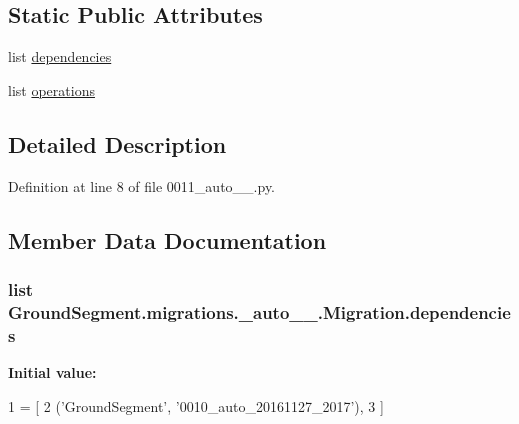 \subsection*{Static Public Attributes}
\begin{DoxyCompactItemize}
\item 
list \hyperlink{class_ground_segment_1_1migrations_1_10011__auto__20161127__2019_1_1_migration_ac56b2578fa158a6fb8bf8867093276b7}{dependencies}
\item 
list \hyperlink{class_ground_segment_1_1migrations_1_10011__auto__20161127__2019_1_1_migration_aa243936ecd74c7dd0820388603605312}{operations}
\end{DoxyCompactItemize}


\subsection{Detailed Description}


Definition at line 8 of file 0011\+\_\+auto\+\_\+\_.\+py.



\subsection{Member Data Documentation}
\hypertarget{class_ground_segment_1_1migrations_1_10011__auto__20161127__2019_1_1_migration_ac56b2578fa158a6fb8bf8867093276b7}{}
\subsubsection[{dependencies}]{\setlength{\rightskip}{0pt plus 5cm}list Ground\+Segment.\+migrations.\+\_\+auto\+\_\+\_.\+Migration.\+dependencies\hspace{0.3cm}{\ttfamily [static]}}\label{class_ground_segment_1_1migrations_1_10011__auto__20161127__2019_1_1_migration_ac56b2578fa158a6fb8bf8867093276b7}
{\bfseries Initial value\+:}
\begin{DoxyCode}
1 = [
2         (\textcolor{stringliteral}{'GroundSegment'}, \textcolor{stringliteral}{'0010\_auto\_20161127\_2017'}),
3     ]
\end{DoxyCode}


